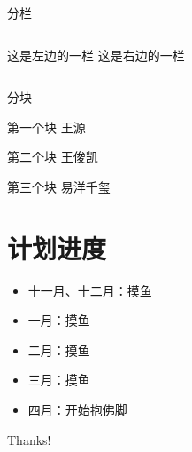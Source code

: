 \documentclass{beamer}
\begin{document}
\begin{frame}{分栏}
    \begin{columns}
        这是左边的一栏
        这是右边的一栏
    \end{columns}
\end{frame}

\begin{frame}{分块}
    \begin{block}{第一个块}
    王源
    \end{block} 
    \begin{block}{第二个块}
    王俊凯
    \end{block} 
    \begin{block}{第三个块}
    易洋千玺
    \end{block} 
\end{frame}

\section{计划进度}

\begin{frame}
    \begin{itemize}
        \item 十一月、十二月：摸鱼
        \item 一月：摸鱼
        \item 二月：摸鱼
        \item 三月：摸鱼
        \item 四月：开始抱佛脚
    \end{itemize}
\end{frame}

\begin{frame}
    \begin{center}
        {\Huge\calligra Thanks!}
    \end{center}
\end{frame}
\end{document}
